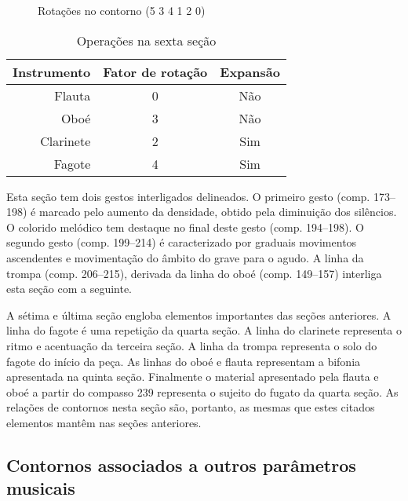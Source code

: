 \begin{figure}
  \centering
  \subfloat[Rotação 2: (4 1 2 0 5 3)]{
    \texttt{[image: c-412053]}
    \label{fig:412053}  
  }
  \subfloat[Rotação 3: (1 2 0 5 3 4)]{
    \texttt{[image: c-120534]}
    \label{fig:120534}  
  }
  \subfloat[Rotação 4: (2 0 5 3 4 1)]{
    \texttt{[image: c-205341]}
    \label{fig:205341}  
  }
  \caption{Rotações no contorno (5 3 4 1 2 0)}
  \label{fig:rotacoes-534120}
\end{figure}

\begin{table}
  \centering
  \begin{tabular}{r|cc}
    Instrumento & Fator de rotação & Expansão \\
    \hline
    Flauta & 0 & Não \\
    Oboé & 3 & Não \\
    Clarinete & 2 & Sim \\
    Fagote & 4 & Sim \\
  \end{tabular}
  \caption{Operações na sexta seção}
  \label{tab:operacoes-secao-6}
\end{table}

Esta seção tem dois gestos interligados delineados. O primeiro gesto
(comp. 173--198) é marcado pelo aumento da densidade, obtido pela
diminuição dos silêncios. O colorido melódico tem destaque no final
deste gesto (comp. 194--198). O segundo gesto (comp. 199--214) é
caracterizado por graduais movimentos ascendentes e movimentação do
âmbito do grave para o agudo. A linha da trompa (comp. 206--215),
derivada da linha do oboé (comp. 149--157) interliga esta seção com a
seguinte.

A sétima e última seção engloba elementos importantes das seções
anteriores. A linha do fagote é uma repetição da quarta seção. A linha
do clarinete representa o ritmo e acentuação da terceira seção. A
linha da trompa representa o solo do fagote do início da peça. As
linhas do oboé e flauta representam a bifonia apresentada na quinta
seção. Finalmente o material apresentado pela flauta e oboé a partir
do compasso 239 representa o sujeito do fugato da quarta seção. As
relações de contornos nesta seção são, portanto, as mesmas que estes
citados elementos mantêm nas seções anteriores.

\subsection{Contornos associados a outros parâmetros musicais}
\label{sec:cont-assoc-outr}

